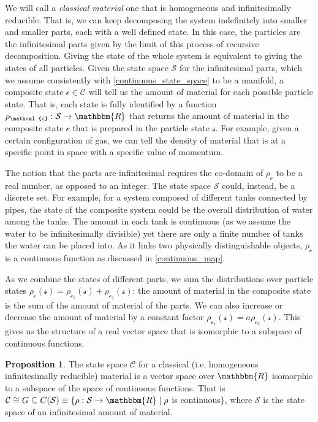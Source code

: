 \documentclass[aps,pra,10pt,twocolumn,floatfix,nofootinbib]{revtex4-1}
\numberwithin{equation}{section}
\theoremstyle{definition}
\newtheorem{prop}[equation]{Proposition}
\begin{document}
We will call a \emph{classical material} one that is homogeneous and infinitesimally reducible. That is, we can keep decomposing the system indefinitely into smaller and smaller parts, each with a well defined state. In this case, the particles are the infinitesimal parts given by the limit of this process of recursive decomposition. Giving the state of the whole system is equivalent to giving the states of all particles. Given the state space $\mathcal{S}$ for the infinitesimal parts, which we assume consistently with \ref{continuous_state_space} to be a manifold, a composite state $\mathcal{c} \in \mathcal{C}$ will tell us the amount of material for each possible particle state. That is, each state is fully identified by a function $\rho_\mathcal{c}: \mathcal{S} \to \mathbbm{R}$ that returns the amount of material in the composite state $\mathcal{c}$ that is prepared in the particle state $\mathcal{s}$. For example, given a certain configuration of gas, we can tell the density of material that is at a specific point in space with a specific value of momentum.

The notion that the parts are infinitesimal requires the co-domain of $\rho_\mathcal{c}$ to be a real number, as opposed to an integer. The state space $\mathcal{S}$ could, instead, be a discrete set. For example, for a system composed of different tanks connected by pipes, the state of the composite system could be the overall distribution of water among the tanks. The amount in each tank is continuous (as we assume the water to be infinitesimally divisible) yet there are only a finite number of tanks the water can be placed into. As it links two physically distinguishable objects, $\rho_\mathcal{c}$ is a continuous function as discussed in \ref{continuous_map}.

As we combine the states of different parts, we sum the distributions over particle states $\rho_{\mathcal{c}}(\mathcal{s})=\rho_{\mathcal{c}_1}(\mathcal{s})+\rho_{\mathcal{c}_2}(\mathcal{s})$: the amount of material in the composite state is the sum of the amount of material of the parts. We can also increase or decrease the amount of material by a constant factor $\rho_{\mathcal{c}_1}(\mathcal{s})=a\rho_{\mathcal{c}_2}(\mathcal{s})$. This gives us the structure of a real vector space that is isomorphic to a subspace of continuous functions.

\begin{prop}\label{classical_vector space}
The state space $\mathcal{C}$ for a classical (i.e. homogeneous infinitesimally reducible) material is a vector space over $\mathbbm{R}$ isomorphic to a subspace of the space of continuous functions. That is $\mathcal{C} \cong G \subseteq C(\mathcal{S}) \equiv \{\rho:\mathcal{S} \rightarrow \mathbbm{R} \; | \; \rho$ is continuous$\}$, where $\mathcal{S}$ is the state space of an infinitesimal amount of material.
\end{prop}
\end{document}
